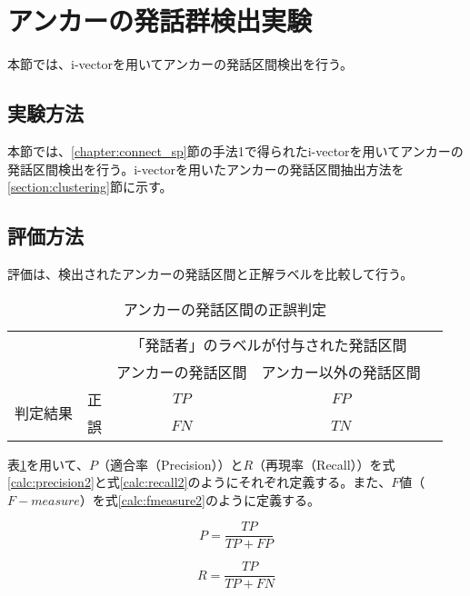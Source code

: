\section{アンカーの発話群検出実験}
本節では、i-vectorを用いてアンカーの発話区間検出を行う。
\label{chapter:get_anchor}
\subsection{実験方法}
本節では、\ref{chapter:connect_sp}節の手法1で得られたi-vectorを用いてアンカーの発話区間検出を行う。i-vectorを用いたアンカーの発話区間抽出方法を\ref{section:clustering}節に示す。

\subsection{評価方法}
評価は、検出されたアンカーの発話区間と正解ラベルを比較して行う。

\begin{table}[H]
\begin{center}
    \caption{アンカーの発話区間の正誤判定 \label{table:clustering}}
\begin{tabular}{|c|c|c|c|l}
\cline{1-4}
\multicolumn{2}{|c|}{\multirow{2}{*}{}} & \multicolumn{2}{c|}{「発話者」のラベルが付与された発話区間} &  \\ \cline{3-4}
\multicolumn{2}{|c|}{}                  & アンカーの発話区間        & アンカー以外の発話区間        &  \\ \cline{1-4}
\multirow{2}{*}{判定結果}        & 正        & $TP$                  & $FP$                   &  \\ \cline{2-4}
& 誤        & $FN$                  & $TN$                   &  \\ \cline{1-4}
\end{tabular}
\end{center}
\end{table}

表\ref{table:clustering}を用いて、$P$（適合率（Precision））と$R$（再現率（Recall））を式\ref{calc:precision2}と式\ref{calc:recall2}のようにそれぞれ定義する。また、$F$値（$F-measure$）を式\ref{calc:fmeasure2}のように定義する。

\begin{equation}
\label{calc:precision2}
P = \frac{TP}{TP + FP}
\end{equation}

\begin{equation}
\label{calc:recall2}
R = \frac{TP}{TP + FN}
\end{equation}

